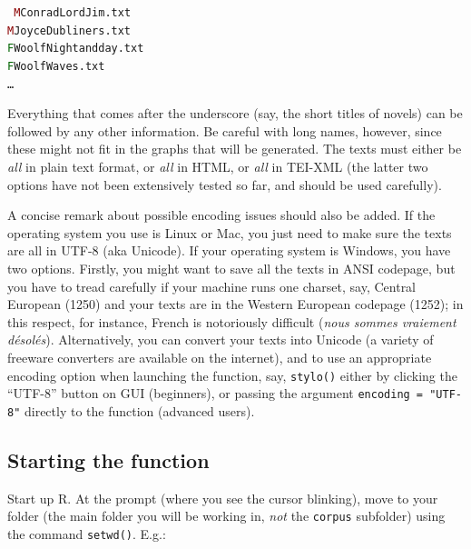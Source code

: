 \documentclass[11pt,a4paper]{article}
\def\underscore{\raisebox{-.8ex}{-}}
\def\code#1{{\tt #1}}
\begin{document}
\medskip

\code{
\noindent
\textcolor{darkred}{M}\underscore Conrad\underscore Lord\underscore Jim.txt \\
\textcolor{darkred}{M}\underscore Joyce\underscore Dubliners.txt \\
\textcolor{darkgreen}{F}\underscore Woolf\underscore Night\underscore and\underscore day.txt \\
\textcolor{darkgreen}{F}\underscore Woolf\underscore Waves.txt \\
\dots
}

\medskip


Everything that comes after the underscore (say, the short titles
of novels) can be followed by any other information. Be careful with
long names, however, since these might not fit in the graphs that
will be generated. The texts must either be \textit{all} in plain
text format, or \textit{all} in HTML, or \textit{all} in TEI-XML (the
latter two options have not been extensively tested so far, and should
be used carefully). 

A concise remark about possible encoding issues should also be added. If the operating system you use is Linux or Mac, you just need to make sure the texts are all in UTF-8 (aka Unicode). If your operating system is Windows, you have two options. Firstly, you might want to save all the texts in ANSI codepage, but you have to tread carefully if your machine runs one charset, say, Central European (1250) and your texts are in the Western European codepage (1252); in this respect, for instance, French is notoriously difficult (\emph{nous sommes vraiement désolés}). Alternatively, you can convert your texts into Unicode (a variety of freeware converters are available on the internet), and to use an appropriate encoding option when launching the function, say, \code{stylo()} either by clicking the ``UTF-8'' button on GUI (beginners), or passing the argument \code{encoding = "UTF-8"} directly to the function (advanced users).



\subsection{Starting the function}

Start up R. At the prompt (where you see the cursor blinking), move
to your folder (the main folder you will be working in, \textit{not}
the \code{corpus} subfolder) using the command \code{setwd()}.
E.g.:
\end{document}
